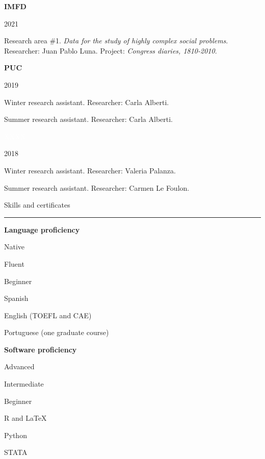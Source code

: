 \documentclass[a4paper, 12pt]{article}
\begin{document}
\begin{multicols}{3}

\textbf{IMFD}

\columnbreak

2021

\columnbreak

Research area \#1. \textit{Data for the study of highly complex social problems}. Researcher: Juan Pablo Luna. Project: \textit{Congress diaries, 1810-2010}.

\end{multicols}


\begin{multicols}{3}

\textbf{PUC}

\columnbreak

2019

\columnbreak

Winter research assistant. Researcher: Carla Alberti.

Summer research assistant. Researcher: Carla Alberti.

\end{multicols}


\begin{multicols}{3}

\textcolor{white}{XXXX}

\columnbreak

2018

\columnbreak

Winter research assistant. Researcher: Valeria Palanza.

Summer research assistant. Researcher: Carmen Le Foulon.

\end{multicols}




\large Skills and certificates
\smallskip
\hrule
\normalsize


\bigskip
\textbf{Language proficiency}

\begin{multicols}{2}

Native

Fluent

Beginner

\columnbreak

Spanish

English (TOEFL and CAE)

Portuguese (one graduate course)

\end{multicols}


\textbf{Software proficiency}

\begin{multicols}{2}

Advanced

Intermediate

Beginner

\columnbreak

\textsf{R} and \LaTeX

\textsf{Python}

\textsf{STATA}

\end{multicols}
\end{document}
